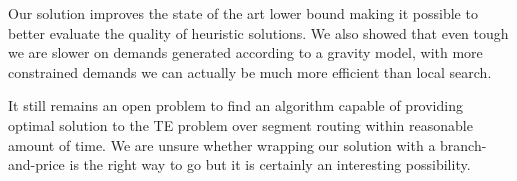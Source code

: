 Our solution improves the state of the art lower bound making it possible to better evaluate the quality
of heuristic solutions. We also showed that even tough we are slower on demands generated according to a 
gravity model, with more constrained demands we can actually be much more efficient than local search.

It still remains an open problem to find an algorithm capable of providing optimal solution to the TE problem 
over segment routing within reasonable amount of time. We are unsure whether wrapping our solution with a branch-and-price
is the right way to go but it is certainly an interesting possibility.
